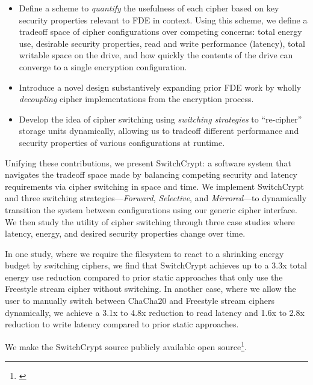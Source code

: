 \begin{itemize}
  \item Define a scheme to \emph{quantify} the usefulness of each cipher based
  on key security properties relevant to FDE in context. Using this scheme, we
  define a tradeoff space of cipher configurations over competing concerns:
  total energy use, desirable security properties, read and write performance
  (latency), total writable space on the drive, and how quickly the contents of
  the drive can converge to a single encryption configuration.

  \item Introduce a novel design substantively expanding prior FDE work by
  wholly \emph{decoupling} cipher implementations from the encryption process.

  \item Develop the idea of cipher switching using \emph{switching strategies}
  to ``re-cipher'' storage units dynamically, allowing us to tradeoff different
  performance and security properties of various configurations at runtime.
\end{itemize}

Unifying these contributions, we present SwitchCrypt: a software system that
navigates the tradeoff space made by balancing competing security and latency
requirements via cipher switching in space and time. We implement SwitchCrypt
and three switching strategies---\emph{Forward}, \emph{Selective}, and
\emph{Mirrored}---to dynamically transition the system between configurations
using our generic cipher interface. We then study the utility of cipher
switching through three case studies where latency, energy, and desired security
properties change over time.

In one study, where we require the filesystem to react to a shrinking energy
budget by switching ciphers, we find that SwitchCrypt achieves up to a 3.3x
total energy use reduction compared to prior static approaches that only use the
Freestyle stream cipher without switching. In another case, where we allow the
user to manually switch between ChaCha20 and Freestyle stream ciphers
dynamically, we achieve a 3.1x to 4.8x reduction to read latency and 1.6x to
2.8x reduction to write latency compared to prior static approaches.

We make the SwitchCrypt source publicly available open
source\footnote{\label{note1}\SystemURI}.
